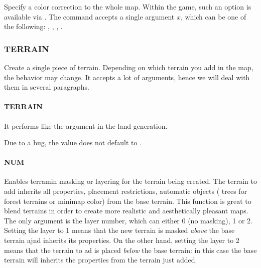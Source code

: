     \subsubsection{}

    Specify a color correction to the whole map. Within the game, such an option is available via . The command accepts a single argument $x$, which can be one of the following: , , , .

    \subsubsection{ TERRAIN}

    Create a single piece of terrain. Depending on which terrain you add in the map, the behavior may change. It accepts a lot of arguments, hence we will deal with them in several paragraphs.

    \paragraph{ TERRAIN}

    It performs like the argument in the land generation.

    \begin{attention}
        Due to a bug, the value does not default to .
    \end{attention}

    \paragraph{ NUM}

    Enables terramin masking or layering for the terrain being created. The terrain to add inherits all properties, placement restrictions, automatic objects (\eg{} trees for forest terrains or minimap color) from the base terrain. This function is great to blend terrains in order to create more realistic and aesthetically pleasant maps. The only argument is the layer number, which can either 0 (no masking), 1 or 2. Setting the layer to 1 means that the new terrain is masked \textit{above} the base terrain ajnd inherits its properties. On the other hand, setting the layer to 2 means that the terrain to ad is placed \textit{below} the base terrain: in this case the base terrain will inherits the properties from the terrain just added.

